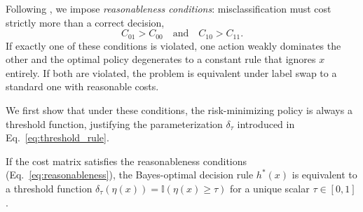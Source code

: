 

Following \citet{elkan2001foundations}, we impose \textit{reasonableness conditions}: misclassification must cost strictly more than a correct decision,
\begin{equation}\label{eq:reasonableness}
    C_{01} > C_{00} \quad \text{and} \quad C_{10} > C_{11}.
\end{equation}
If exactly one of these conditions is violated, one action weakly dominates the other and the optimal policy degenerates to a constant rule that ignores $x$ entirely. If both are violated, the problem is equivalent under label swap to a standard one with reasonable costs.

We first show that under these conditions, the risk-minimizing policy is always a threshold function, justifying the parameterization $\delta_\tau$ introduced in Eq.~\ref{eq:threshold_rule}.

\begin{lemma}\label{lem:threshold_optimality}
If the cost matrix satisfies the reasonableness conditions (Eq.~\ref{eq:reasonableness}), the Bayes-optimal decision rule $h^*(x)$ is equivalent to a threshold function $\delta_\tau(\eta(x)) = \mathbb{I}(\eta(x) \geq \tau)$ for a unique scalar $\tau \in [0, 1]$.
\end{lemma}

